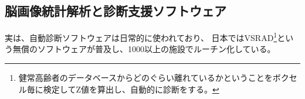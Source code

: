 %
%
%
%
%
%
%
%


\subsection{脳画像統計解析と診断支援ソフトウェア}
実は、自動診断ソフトウェアは日常的に使われており、
日本ではVSRAD\footnote{健常高齢者のデータベースからどのぐらい離れているかということをボクセル毎に検定してZ値を算出し、自動的に診断をする。}という無償のソフトウェアが普及し、1000以上の施設でルーチン化している。
